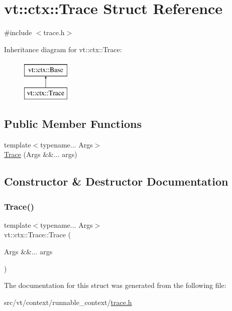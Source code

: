 \hypertarget{structvt_1_1ctx_1_1_trace}{}\section{vt\+:\+:ctx\+:\+:Trace Struct Reference}
\label{structvt_1_1ctx_1_1_trace}


{\ttfamily \#include $<$trace.\+h$>$}

Inheritance diagram for vt\+:\+:ctx\+:\+:Trace\+:\begin{figure}[H]
\begin{center}
\leavevmode
\includegraphics[height=2.000000cm]{structvt_1_1ctx_1_1_trace}
\end{center}
\end{figure}
\subsection*{Public Member Functions}
\begin{DoxyCompactItemize}
\item 
{\footnotesize template$<$typename... Args$>$ }\\\hyperlink{structvt_1_1ctx_1_1_trace_a833a6404ae6cfe8d26e1e3ca7185119b}{Trace} (Args \&\&... args)
\end{DoxyCompactItemize}


\subsection{Constructor \& Destructor Documentation}
\mbox{\label{structvt_1_1ctx_1_1_trace_a833a6404ae6cfe8d26e1e3ca7185119b}} 
\subsubsection{\texorpdfstring{Trace()}{Trace()}}
{\footnotesize\ttfamily template$<$typename... Args$>$ \\
vt\+::ctx\+::\+Trace\+::\+Trace (\begin{DoxyParamCaption}\item[{Args \&\&...}]{args }\end{DoxyParamCaption})\hspace{0.3cm}{\ttfamily [inline]}}



The documentation for this struct was generated from the following file\+:\begin{DoxyCompactItemize}
\item 
src/vt/context/runnable\+\_\+context/\hyperlink{context_2runnable__context_2trace_8h}{trace.\+h}\end{DoxyCompactItemize}
